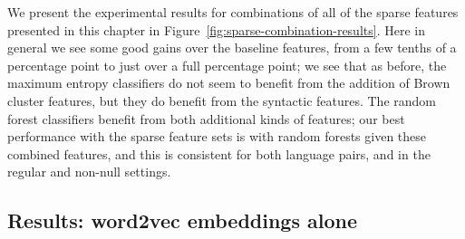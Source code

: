 We present the experimental results for combinations of all of the sparse
features presented in this chapter in
Figure~\ref{fig:sparse-combination-results}. Here in general we see some good
gains over the baseline features, from a few tenths of a percentage point to
just over a full percentage point; we see that as before, the maximum entropy
classifiers do not seem to benefit from the addition of Brown cluster features,
but they do benefit from the syntactic features. The random forest classifiers
benefit from both additional kinds of features; our best performance with the
sparse feature sets is with random forests given these combined features, and
this is consistent for both language pairs, and in the regular and non-null
settings.

\subsection{Results: word2vec embeddings alone}

